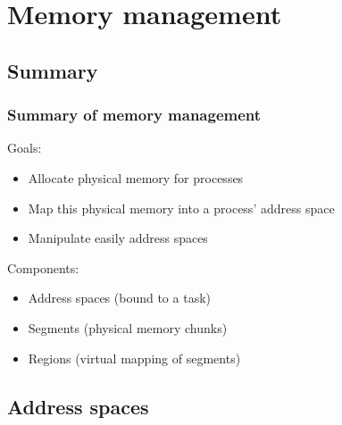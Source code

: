 %
%

\section{Memory management}

%
%

\subsection{Summary}


\begin{frame}
  \frametitle{Summary of memory management}

  Goals:

  \-

  \begin{itemize}
  \item Allocate physical memory for processes
  \item Map this physical memory into a process' address space
  \item Manipulate easily address spaces
  \end{itemize}

  \-

  Components:

  \-

  \begin{itemize}
  \item Address spaces (bound to a task)
  \item Segments (physical memory chunks)
  \item Regions (virtual mapping of segments)
  \end{itemize}

\end{frame}

%
%

\subsection{Address spaces}


